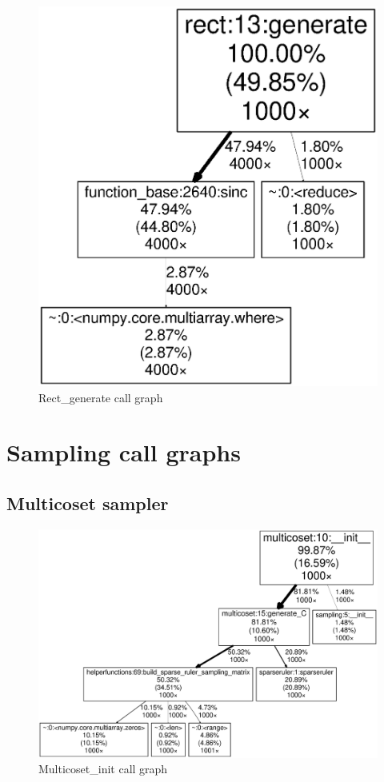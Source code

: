 \documentclass[a4paper, openany, oneside]{memoir}
\begin{document}
\begin{figure}[H]
    \centering
    \includegraphics[width=0.8\linewidth]{Rect_generate}
    \caption{Rect\_generate call graph}
    \label{fig:Rect_generate}
\end{figure}

\section{Sampling call graphs}
\label{sec:sampling_call_graphs}
\subsection{Multicoset sampler}
\label{sub:multicoset_sampler}

\begin{figure}[H]
    \centering
    \includegraphics[width=0.8\linewidth]{MultiCoset_init}
    \caption{Multicoset\_init call graph}
    \label{fig:Multicoset_init}
\end{figure}
\end{document}
